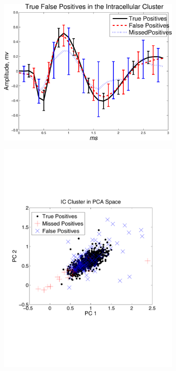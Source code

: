 \begin{center}
\begin{figure}
	\begin{subfigure}[b]{.33\textwidth}
	\includegraphics[width=\textwidth]{../figs/IntracellularTrueFalsePositivesv2}
	\caption{}
	\label{truewaveforms}
	\end{subfigure}
\begin{subfigure}[b]{.33\textwidth}
\includegraphics[width=\textwidth]{../figs/new/ICclusteroldpca.pdf}

\end{subfigure}
\end{figure}
\end{center}
